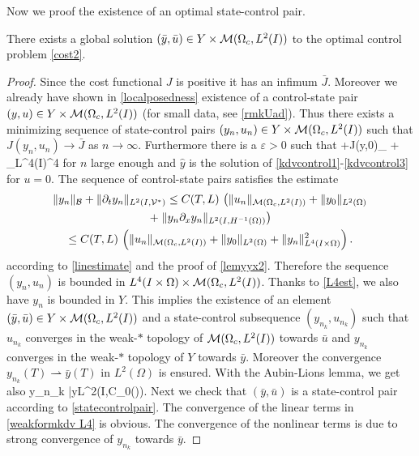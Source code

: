 Now we proof the existence of an optimal state-control pair.
\begin{proposition}
There exists a global solution $(\bar y, \bar u)\in Y\times \mathcal{M}(\Omega_c, L^{2}(I)) $ to the optimal control problem \eqref{cost2}.
\end{proposition}
\begin{proof}
Since the cost functional $J$ is positive it has an infimum $\bar J$. Moreover we already have shown in \cref{localposedness} existence of a control-state pair $(y,u)\in Y\times \mathcal{M}(\Omega_c, L^{2}(I))$ (for small data, see \cref{rmkUad}). Thus there exists a minimizing sequence of state-control pairs $(y_n,u_n) \in Y\times \mathcal{M}(\Omega_c, L^{2}(I))$ such that $J(y_n, u_n) \rightarrow \bar J$ as $n \rightarrow \infty$. Furthermore there is a $\varepsilon>0$ such that
\be
\varepsilon+J(\hat y,0)\geq \alpha {}_{\M} +  _{L^4(I\times \Omega)}^4
\ee
for $n$ large enough and $\hat y$ is the solution of \eqref{kdvcontrol1}-\eqref{kdvcontrol3} for $u=0$. The sequence of control-state pairs satisfies the estimate
\begin{multline}\label{L4est}
\|y_n\|_{\mathcal{B}}+\|\partial_{t}y_n\|_{L^2(I,\mathcal{V}^{*})}\leq C(T,L)\,\left(\|u_n\|_{\M}+\|y_0\|_{L^2(\Omega)}\right.\\
+\left.\|y_n\partial_x y_n\|_{\Hm1}\right)\\
\leq C(T,L)\,\left(\|u_n\|_{\M}+\|y_0\|_{L^2(\Omega)} + \|y_n\|_{L^4(I\times\Omega)}^2\right).
\end{multline}
according to \eqref{linestimate} and the proof of \cref{lemyyx2}. Therefore the sequence $(y_n,u_n)$ is bounded in $L^4(I\times\Omega)\times \mathcal{M}(\Omega_c, L^{2}(I))$. Thanks to \eqref{L4est}, we also have $y_n$ is bounded in $Y$. This implies the existence of an element $(\bar y, \bar u)\in Y\times \mathcal{M}(\Omega_c, L^{2}(I))$ and a state-control subsequence $(y_{n_k},u_{n_k})$ such that $u_{n_k}$ converges in the weak-$*$ topology of $\mathcal{M}(\Omega_c, L^{2}(I))$ towards $\bar u$ and $y_{n_k}$ converges in the weak-$\ast$ topology of $Y$ towards $\bar y$. Moreover the convergence $y_{n_k}(T) \rightharpoonup \bar y(T)$ in $L^2(\Omega)$ is ensured. With the Aubin-Lions lemma, we get also
\be
\nonumber
y_{n_k} \rightarrow \bar y\quad{}\quad L^2(I,\mathcal C_0(\Omega)).
\ee
Next we check that $(\bar y, \bar u)$ is a state-control pair according to \cref{statecontrolpair}. The convergence of the linear terms in \eqref{weakformkdv L4} is obvious. The convergence of the nonlinear terms is due to strong convergence of $y_{n_k}$ towards $\bar y$. %

\end{proof}
